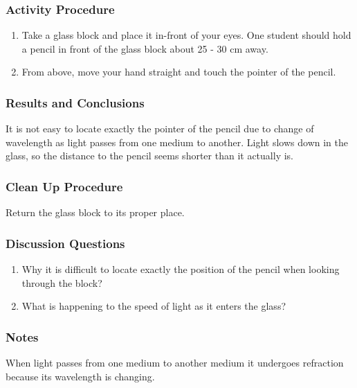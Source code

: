 \subsubsection*{Activity Procedure}
\begin{enumerate}
\item{Take a glass block and place it in-front of your eyes. One student should hold a pencil in front of the glass block about 25 - 30 cm away.} 
\item{From above, move your hand straight and touch the pointer of the pencil.} 
\end{enumerate}

\subsubsection*{Results and Conclusions}
It is not easy to locate exactly the pointer of the pencil due to change of wavelength as light passes from one medium to another. Light slows down in the glass, so the distance to the pencil seems shorter than it actually is.  

\subsubsection*{Clean Up Procedure}
Return the glass block to its proper place.

\subsubsection*{Discussion Questions}
\begin{enumerate}
\item{Why it is difficult to locate exactly the position of the pencil when looking through the block?}
\item{What is happening to the speed of light as it enters the glass?}
\end{enumerate}

\subsubsection*{Notes}
When light passes from one medium to another medium it undergoes refraction because its wavelength is changing.




